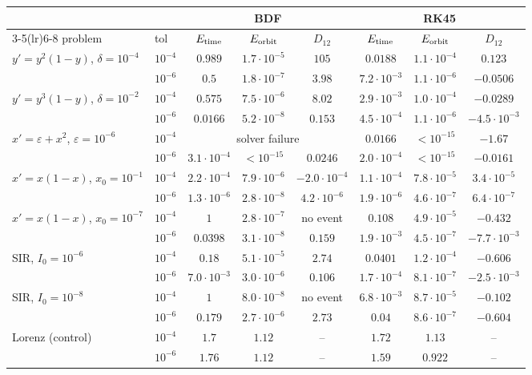 \begin{tabular}{llcccccc}
\toprule
& & \multicolumn{3}{c}{BDF} & \multicolumn{3}{c}{RK45}\\
\cmidrule(lr){3-5}\cmidrule(lr){6-8}
problem & tol & $E_{\rm time}$ & $E_{\rm orbit}$ & $D_{12}$ & $E_{\rm time}$ & $E_{\rm orbit}$ & $D_{12}$\\
\midrule
$y'=y^2(1-y)$, $\delta=10^{-4}$ & $10^{-4}$ & $0.989$ & $1.7\cdot10^{-5}$ & $105$ & $0.0188$ & $1.1\cdot10^{-4}$ & $0.123$ \\
 & $10^{-6}$ & $0.5$ & $1.8\cdot10^{-7}$ & $3.98$ & $7.2\cdot10^{-3}$ & $1.1\cdot10^{-6}$ & $-0.0506$ \\
$y'=y^3(1-y)$, $\delta=10^{-2}$ & $10^{-4}$ & $0.575$ & $7.5\cdot10^{-6}$ & $8.02$ & $2.9\cdot10^{-3}$ & $1.0\cdot10^{-4}$ & $-0.0289$ \\
 & $10^{-6}$ & $0.0166$ & $5.2\cdot10^{-8}$ & $0.153$ & $4.5\cdot10^{-4}$ & $1.1\cdot10^{-6}$ & $-4.5\cdot10^{-3}$ \\
$x'=\varepsilon+x^2$, $\varepsilon=10^{-6}$ & $10^{-4}$ & \multicolumn{3}{c}{solver failure} & $0.0166$ & $<10^{-15}$ & $-1.67$ \\
 & $10^{-6}$ & $3.1\cdot10^{-4}$ & $<10^{-15}$ & $0.0246$ & $2.0\cdot10^{-4}$ & $<10^{-15}$ & $-0.0161$ \\
$x'=x(1-x)$, $x_0=10^{-1}$ & $10^{-4}$ & $2.2\cdot10^{-4}$ & $7.9\cdot10^{-6}$ & $-2.0\cdot10^{-4}$ & $1.1\cdot10^{-4}$ & $7.8\cdot10^{-5}$ & $3.4\cdot10^{-5}$ \\
 & $10^{-6}$ & $1.3\cdot10^{-6}$ & $2.8\cdot10^{-8}$ & $4.2\cdot10^{-6}$ & $1.9\cdot10^{-6}$ & $4.6\cdot10^{-7}$ & $6.4\cdot10^{-7}$ \\
$x'=x(1-x)$, $x_0=10^{-7}$ & $10^{-4}$ & $1$ & $2.8\cdot10^{-7}$ & no event & $0.108$ & $4.9\cdot10^{-5}$ & $-0.432$ \\
 & $10^{-6}$ & $0.0398$ & $3.1\cdot10^{-8}$ & $0.159$ & $1.9\cdot10^{-3}$ & $4.5\cdot10^{-7}$ & $-7.7\cdot10^{-3}$ \\
SIR, $I_0=10^{-6}$ & $10^{-4}$ & $0.18$ & $5.1\cdot10^{-5}$ & $2.74$ & $0.0401$ & $1.2\cdot10^{-4}$ & $-0.606$ \\
 & $10^{-6}$ & $7.0\cdot10^{-3}$ & $3.0\cdot10^{-6}$ & $0.106$ & $1.7\cdot10^{-4}$ & $8.1\cdot10^{-7}$ & $-2.5\cdot10^{-3}$ \\
SIR, $I_0=10^{-8}$ & $10^{-4}$ & $1$ & $8.0\cdot10^{-8}$ & no event & $6.8\cdot10^{-3}$ & $8.7\cdot10^{-5}$ & $-0.102$ \\
 & $10^{-6}$ & $0.179$ & $2.7\cdot10^{-6}$ & $2.73$ & $0.04$ & $8.6\cdot10^{-7}$ & $-0.604$ \\
Lorenz (control) & $10^{-4}$ & $1.7$ & $1.12$ & -- & $1.72$ & $1.13$ & -- \\
 & $10^{-6}$ & $1.76$ & $1.12$ & -- & $1.59$ & $0.922$ & -- \\
\bottomrule
\end{tabular}
